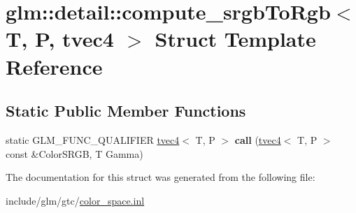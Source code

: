 \hypertarget{structglm_1_1detail_1_1compute__srgbToRgb_3_01T_00_01P_00_01tvec4_01_4}{}\section{glm\+:\+:detail\+:\+:compute\+\_\+srgb\+To\+Rgb$<$ T, P, tvec4 $>$ Struct Template Reference}
\label{structglm_1_1detail_1_1compute__srgbToRgb_3_01T_00_01P_00_01tvec4_01_4}
\subsection*{Static Public Member Functions}
\begin{DoxyCompactItemize}
\item 
\mbox{\label{structglm_1_1detail_1_1compute__srgbToRgb_3_01T_00_01P_00_01tvec4_01_4_a09238f9fb7bdd410512b3daf66ecabbc}} 
static G\+L\+M\+\_\+\+F\+U\+N\+C\+\_\+\+Q\+U\+A\+L\+I\+F\+I\+ER \hyperlink{structglm_1_1tvec4}{tvec4}$<$ T, P $>$ {\bfseries call} (\hyperlink{structglm_1_1tvec4}{tvec4}$<$ T, P $>$ const \&Color\+S\+R\+GB, T Gamma)
\end{DoxyCompactItemize}


The documentation for this struct was generated from the following file\+:\begin{DoxyCompactItemize}
\item 
include/glm/gtc/\hyperlink{gtc_2color__space_8inl}{color\+\_\+space.\+inl}\end{DoxyCompactItemize}
